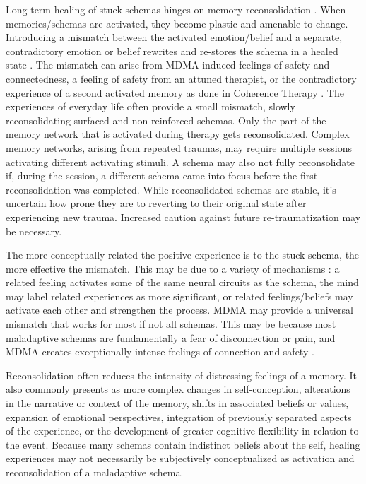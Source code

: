 \documentclass[12pt,letterpaper]{book}
\begin{document}
Long-term healing of stuck schemas hinges on memory reconsolidation \cite{fedduciaMDMAMemoryReconsolidation}. When memories/schemas are activated, they become plastic and amenable to change. Introducing a mismatch between the activated emotion/belief and a separate, contradictory emotion or belief rewrites and re-stores the schema in a healed state \cite{laneReconsolidation}. The mismatch can arise from MDMA-induced feelings of safety and connectedness, a feeling of safety from an attuned therapist, or the contradictory experience of a second activated memory as done in Coherence Therapy \cite{eckerUnlocking}. The experiences of everyday life often provide a small mismatch, slowly reconsolidating surfaced and non-reinforced schemas. Only the part of the memory network that is activated during therapy gets reconsolidated. Complex memory networks, arising from repeated traumas, may require multiple sessions activating different activating stimuli. A schema may also not fully reconsolidate if, during the session, a different schema came into focus before the first reconsolidation was completed. While reconsolidated schemas are stable, it's uncertain how prone they are to reverting to their original state after experiencing new trauma. Increased caution against future re-traumatization may be necessary.

The more conceptually related the positive experience is to the stuck schema, the more effective the mismatch. This may be due to a variety of mechanisms : a related feeling activates some of the same neural circuits as the schema, the mind may label related experiences as more significant, or related feelings/beliefs may activate each other and strengthen the process. MDMA may provide a universal mismatch that works for most if not all schemas. This may be because most maladaptive schemas are fundamentally a fear of disconnection or pain, and MDMA creates exceptionally intense feelings of connection and safety \cite{brownDaring}.

Reconsolidation often reduces the intensity of distressing feelings of a memory. It also commonly presents as more complex changes in self-conception, alterations in the narrative or context of the memory, shifts in associated beliefs or values, expansion of emotional perspectives, integration of previously separated aspects of the experience, or the development of greater cognitive flexibility in relation to the event. Because many schemas contain indistinct beliefs about the self, healing experiences may not necessarily be subjectively conceptualized as activation and reconsolidation of a maladaptive schema.
\end{document}
